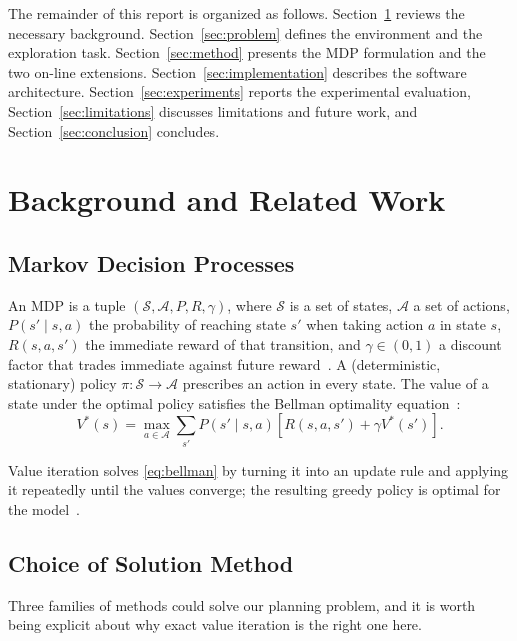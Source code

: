 \documentclass[conference]{IEEEtran}
\begin{document}
The remainder of this report is organized as follows. Section~\ref{sec:background} reviews the necessary background. Section~\ref{sec:problem} defines the environment and the exploration task. Section~\ref{sec:method} presents the MDP formulation and the two on-line extensions. Section~\ref{sec:implementation} describes the software architecture. Section~\ref{sec:experiments} reports the experimental evaluation, Section~\ref{sec:limitations} discusses limitations and future work, and Section~\ref{sec:conclusion} concludes.

\section{Background and Related Work}\label{sec:background}

\subsection{Markov Decision Processes}

An MDP is a tuple $(\mathcal{S}, \mathcal{A}, P, R, \gamma)$, where $\mathcal{S}$ is a set of states, $\mathcal{A}$ a set of actions, $P(s' \mid s, a)$ the probability of reaching state $s'$ when taking action $a$ in state $s$, $R(s, a, s')$ the immediate reward of that transition, and $\gamma \in (0, 1)$ a discount factor that trades immediate against future reward~\cite{puterman1994, suttonbarto2018}. A (deterministic, stationary) policy $\pi : \mathcal{S} \to \mathcal{A}$ prescribes an action in every state. The value of a state under the optimal policy satisfies the Bellman optimality equation~\cite{bellman1957}:
\begin{equation}
  V^{*}(s) = \max_{a \in \mathcal{A}} \sum_{s'} P(s' \mid s, a)\left[ R(s, a, s') + \gamma V^{*}(s') \right].
  \label{eq:bellman}
\end{equation}

Value iteration solves \eqref{eq:bellman} by turning it into an update rule and applying it repeatedly until the values converge; the resulting greedy policy is optimal for the model~\cite{puterman1994}.

\subsection{Choice of Solution Method}

Three families of methods could solve our planning problem, and it is worth being explicit about why exact value iteration is the right one here.
\end{document}
